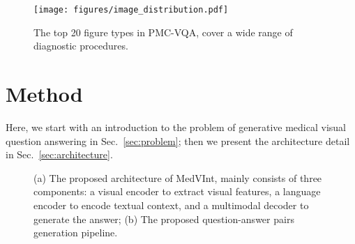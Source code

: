\documentclass{article}
\begin{document}
\begin{figure}[!tb]
    \centering
    \texttt{[image: figures/image\_distribution.pdf]}
    \caption{The top 20 figure types in PMC-VQA, cover a wide range of diagnostic procedures.}
    \label{fig:image_distribution}
    \vspace{-0.5cm}
\end{figure}


















































%
 
\section{Method}
Here, we start with an introduction to the problem of generative medical visual question answering in Sec.~\ref{sec:problem}; 
then we present the architecture detail in Sec.~\ref{sec:architecture}.


\begin{figure}[ht]
\centering
{}
\vspace{-0.2cm}
\caption{(a) The proposed architecture of MedVInt, mainly consists of three components: a visual encoder to extract visual features, a language encoder to encode textual context, and a multimodal decoder to generate the answer; (b) The proposed question-answer pairs generation pipeline.}
\vspace{-0.3cm}
\end{figure}
\end{document}

